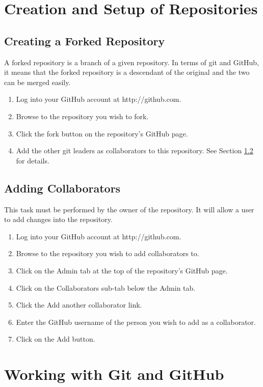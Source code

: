 \documentclass{article}
\begin{document}

\section{Creation and Setup of Repositories}

\subsection{Creating a Forked Repository}
\label{fork}
A forked repository is a branch of a given repository. In terms of git and GitHub, it means that the forked repository is a descendant of the original and the two can be merged easily.
\begin{enumerate}
	\item Log into your GitHub account at http://github.com.
	\item Browse to the repository you wish to fork.
	\item Click the fork button on the repository's GitHub page.
	\item Add the other git leaders as collaborators to this repository. See Section \ref{add-collab} for details.
\end{enumerate}

\subsection{Adding Collaborators}
\label{add-collab}
This task must be performed by the owner of the repository. It will allow a user to add changes into the repository.
\begin{enumerate}
	\item Log into your GitHub account at http://github.com.
	\item Browse to the repository you wish to add collaborators to.
	\item Click on the Admin tab at the top of the repository's GitHub page.
	\item Click on the Collaborators sub-tab below the Admin tab.
	\item Click the Add another collaborator link.
	\item Enter the GitHub username of the person you wish to add as a collaborator.
	\item Click on the Add button.
\end{enumerate}


\section{Working with Git and GitHub}
\end{document}
